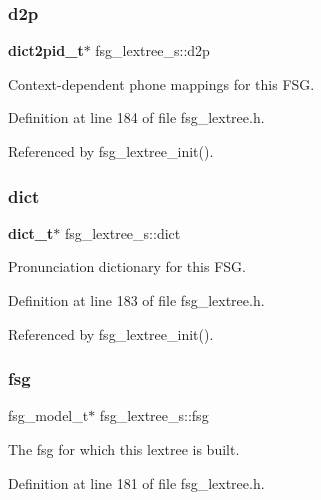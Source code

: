 \mbox{\label{structfsg__lextree__s_add12fb7151ebdecb74deaf6aca86d95e}} 
\subsubsection{d2p}
{\footnotesize\ttfamily \textbf{ dict2pid\+\_\+t}$\ast$ fsg\+\_\+lextree\+\_\+s\+::d2p}



Context-\/dependent phone mappings for this F\+SG. 



Definition at line 184 of file fsg\+\_\+lextree.\+h.



Referenced by fsg\+\_\+lextree\+\_\+init().

\mbox{\label{structfsg__lextree__s_abf077af1c0dd1246b2032b917bfacba5}} 
\subsubsection{dict}
{\footnotesize\ttfamily \textbf{ dict\+\_\+t}$\ast$ fsg\+\_\+lextree\+\_\+s\+::dict}



Pronunciation dictionary for this F\+SG. 



Definition at line 183 of file fsg\+\_\+lextree.\+h.



Referenced by fsg\+\_\+lextree\+\_\+init().

\mbox{\label{structfsg__lextree__s_a161ff35c65373388f18e51236bf7ef5f}} 
\subsubsection{fsg}
{\footnotesize\ttfamily fsg\+\_\+model\+\_\+t$\ast$ fsg\+\_\+lextree\+\_\+s\+::fsg}



The fsg for which this lextree is built. 



Definition at line 181 of file fsg\+\_\+lextree.\+h.



